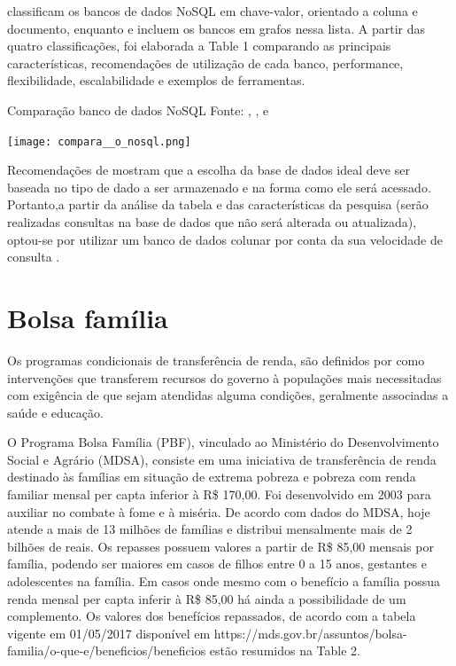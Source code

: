 \documentclass[12pt]{article}
\begin{document}
	\cite{Han:2011} classificam os bancos de dados NoSQL em chave-valor, orientado a coluna e documento, enquanto \cite{Strauch:2011} e \cite{Hecht:2011} incluem os bancos em grafos nessa lista. A partir das quatro classificações, foi elaborada a Table 1  comparando as principais características, recomendações de utilização de cada banco, performance, flexibilidade, escalabilidade e exemplos de ferramentas.

\begin{table}[ht]
\centering
\caption{Comparação banco de dados NoSQL \newline
Fonte: \cite{Angles:2010}, \cite{Han:2011}, \cite{Strauch:2011} e \cite{Cattell:2010}}
\label{tab:exTable1}
\texttt{[image: compara\_\_o\_nosql.png]}
\end{table} 

Recomendações de \cite{Corbelini:2017} mostram que a escolha da base de dados ideal deve ser baseada no tipo de dado a ser armazenado e na forma como ele será acessado. Portanto,a partir da análise da tabela e das características da pesquisa (serão realizadas consultas na base de dados que não será alterada ou atualizada), optou-se por utilizar um banco de dados colunar por conta da sua velocidade de consulta .


\section{Bolsa família}

	Os programas condicionais de transferência de renda, são definidos por \cite{Rasella:2013} como intervenções que transferem recursos do governo à populações mais necessitadas com exigência de que sejam atendidas alguma condições, geralmente associadas a saúde e educação. \newline
    
    O Programa Bolsa Família (PBF), vinculado ao Ministério do Desenvolvimento Social e Agrário (MDSA), consiste em uma iniciativa de transferência de renda destinado às famílias em situação de extrema pobreza e pobreza com renda familiar mensal per capta inferior à R\$ 170,00. Foi desenvolvido em 2003 para auxiliar no combate à fome e à miséria. De acordo com dados do MDSA, hoje atende a mais de 13 milhões de famílias e distribui mensalmente mais de 2 bilhões de reais. Os repasses possuem valores a partir de R\$ 85,00 mensais por família, podendo ser maiores em casos de filhos entre 0 a 15 anos, gestantes e adolescentes na família. Em casos onde mesmo com o benefício a família possua renda mensal per capta inferir à R\$ 85,00 há ainda a possibilidade de um complemento. Os valores dos benefícios repassados, de acordo com a tabela vigente em 01/05/2017 disponível em https://mds.gov.br/assuntos/bolsa-familia/o-que-e/beneficios/beneficios estão resumidos na Table 2. 
\end{document}

